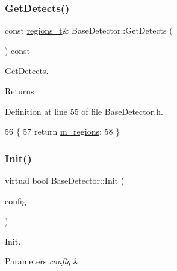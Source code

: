 \mbox{\label{class_base_detector_a52ac4b2feed15a47de84a69eb45c233f}} 
\subsubsection{\texorpdfstring{Get\+Detects()}{GetDetects()}}
{\footnotesize\ttfamily const \mbox{\hyperlink{defines_8h_a01db0de56a20f4342820a093c5154536}{regions\+\_\+t}}\& Base\+Detector\+::\+Get\+Detects (\begin{DoxyParamCaption}{ }\end{DoxyParamCaption}) const\hspace{0.3cm}{\ttfamily [inline]}}



Get\+Detects. 

\begin{DoxyReturn}{Returns}

\end{DoxyReturn}


Definition at line 55 of file Base\+Detector.\+h.


\begin{DoxyCode}
56     \{
57         \textcolor{keywordflow}{return} \mbox{\hyperlink{class_base_detector_a409c20093acba261db8354ca72058fce}{m\_regions}};
58     \}
\end{DoxyCode}
\mbox{\label{class_base_detector_a44c53608e9e4e3455ff553d987165260}} 
\subsubsection{\texorpdfstring{Init()}{Init()}}
{\footnotesize\ttfamily virtual bool Base\+Detector\+::\+Init (\begin{DoxyParamCaption}\item[{const \mbox{\hyperlink{defines_8h_a81d657237a541d02f8eeefdd40191920}{config\+\_\+t}} \&}]{config }\end{DoxyParamCaption})\hspace{0.3cm}{\ttfamily [pure virtual]}}



Init. 


\begin{DoxyParams}{Parameters}
{\em config} & \\
\hline
\end{DoxyParams}


